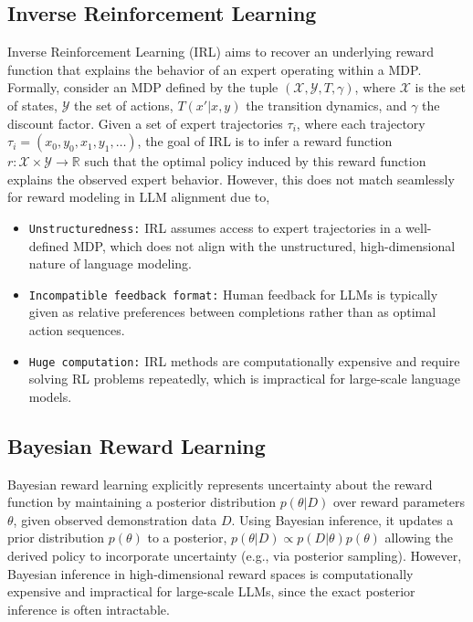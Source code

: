 \subsection{Inverse Reinforcement Learning}

Inverse Reinforcement Learning (IRL) aims to recover an underlying reward function that explains the behavior of an expert operating within a MDP. Formally, consider an MDP defined by the tuple $(\mathcal{X}, \mathcal{Y}, T, \gamma)$, where $\mathcal{X}$ is the set of states, $\mathcal{Y}$ the set of actions, $T(x' | x, y)$ the transition dynamics, and $\gamma$ the discount factor. Given a set of expert trajectories ${\tau_i}$, where each trajectory $\tau_i = (x_0, y_0, x_1, y_1, \dots)$, the goal of IRL is to infer a reward function $r: \mathcal{X} \times \mathcal{Y} \rightarrow \mathbb{R}$ such that the optimal policy induced by this reward function explains the observed expert behavior. However, this does not match seamlessly for reward modeling in LLM alignment due to,
\begin{itemize}
    \item \texttt{Unstructuredness:} IRL assumes access to expert trajectories in a well-defined MDP, which does not align with the unstructured, high-dimensional nature of language modeling.
    \item \texttt{Incompatible feedback format:} Human feedback for LLMs is typically given as relative preferences between completions rather than as optimal action sequences.
    \item \texttt{Huge computation:} IRL methods are computationally expensive and require solving RL problems repeatedly, which is impractical for large-scale language models.
\end{itemize}

\subsection{Bayesian Reward Learning}

Bayesian reward learning explicitly represents uncertainty about the reward function by maintaining a posterior distribution $p(\theta | D)$ over reward parameters $\theta$, given observed demonstration data $D$. Using Bayesian inference, it updates a prior distribution $p(\theta)$ to a posterior, $p(\theta | D) \propto p(D | \theta) p(\theta)$
allowing the derived policy to incorporate uncertainty (e.g., via posterior sampling). However, Bayesian inference in high-dimensional reward spaces is computationally expensive and impractical for large-scale LLMs, since the exact posterior inference is often intractable.
